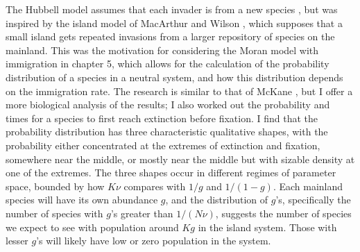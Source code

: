 The Hubbell model assumes that each invader is from a new species \cite{Hubbell2001}, but was inspired by the island model of MacArthur and Wilson \cite{MacArthur1967a}, which supposes that a small island gets repeated invasions from a larger repository of species on the mainland. 
This was the motivation for considering the Moran model with immigration in chapter 5, which allows for the calculation of the probability distribution of a species in a neutral system, and how this distribution depends on the immigration rate. %
The research is similar to that of McKane \cite{McKane2004}, but I offer a more biological analysis of the results; I also worked out the probability and times for a species to first reach extinction before fixation. %
I find that the probability distribution has three characteristic qualitative shapes, with the probability either concentrated at the extremes of extinction and fixation, somewhere near the middle, or mostly near the middle but with sizable density at one of the extremes. 
The three shapes occur in different regimes of parameter space, bounded by how $K\nu$ compares with $1/g$ and $1/(1-g)$. 
Each mainland species will have its own abundance $g$, and the distribution of $g$'s, specifically the number of species with $g$'s greater than $1/(N\nu)$, suggests the number of species we expect to see with population around $K g$ in the island system. 
Those with lesser $g$'s will likely have low or zero population in the system. 




